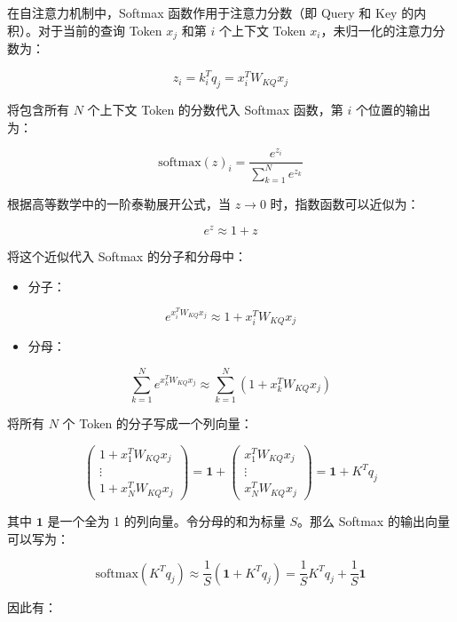 在自注意力机制中，Softmax 函数作用于注意力分数（即 Query 和 Key 的内积）。对于当前的查询 Token \(x_j\) 和第 \(i\) 个上下文 Token \(x_i\)，未归一化的注意力分数为：

\[
z_i = k_i^T q_j = x_i^T W_{KQ}x_j
\]

将包含所有 \(N\) 个上下文 Token 的分数代入 Softmax 函数，第 \(i\) 个位置的输出为：

\[
\mathrm{softmax}(z)_i = \frac{e^{z_i}}{\sum_{k=1}^{N} e^{z_k}}
\]

根据高等数学中的一阶泰勒展开公式，当 \(z \to 0\) 时，指数函数可以近似为：

\[
e^z \approx 1 + z
\]

将这个近似代入 Softmax 的分子和分母中：

\begin{itemize}
\tightlist
\item
{}
  分子：
\end{itemize}

\[
e^{x_i^T W_{KQ}x_j} \approx 1 + x_i^T W_{KQ}x_j
\]

\begin{itemize}
\tightlist
\item
{}
  分母：
\end{itemize}

\[
\sum_{k=1}^{N} e^{x_k^T W_{KQ}x_j} \approx \sum_{k=1}^{N}(1+x_k^T W_{KQ}x_j)
\]

将所有 \(N\) 个 Token 的分子写成一个列向量：

\[
\begin{pmatrix}
1+x_1^T W_{KQ}x_j \\
\vdots \\
1+x_N^T W_{KQ}x_j
\end{pmatrix}
= \mathbf{1}+
\begin{pmatrix}
x_1^T W_{KQ}x_j \\
\vdots \\
x_N^T W_{KQ}x_j
\end{pmatrix}
= \mathbf{1}+K^Tq_j
\]

其中 \(\mathbf{1}\) 是一个全为 1 的列向量。令分母的和为标量 \(S\)。那么 Softmax 的输出向量可以写为：

\[
\mathrm{softmax}(K^Tq_j) \approx \frac{1}{S}(\mathbf{1}+K^Tq_j)
= \frac{1}{S}K^Tq_j+\frac{1}{S}\mathbf{1}
\]

因此有：

